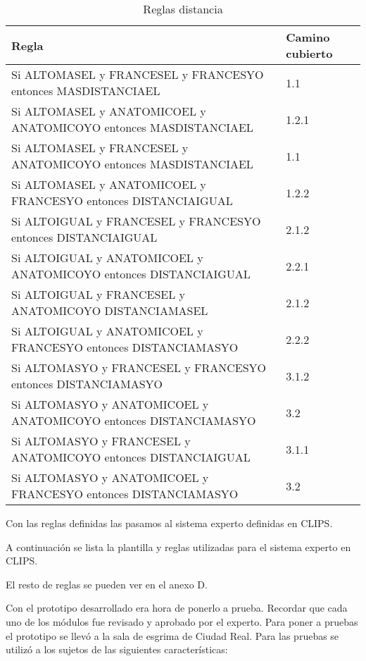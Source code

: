 \begin{table}[]
  \centering
  \caption{Reglas distancia}
  \label{tab:Reglas distancia}
  \begin{tabular}{|ll|}
    \hline
    Regla & Camino cubierto \\ \hline
    Si ALTOMASEL y FRANCESEL y FRANCESYO entonces MASDISTANCIAEL & 1.1 \\
    Si ALTOMASEL y ANATOMICOEL y ANATOMICOYO entonces MASDISTANCIAEL & 1.2.1 \\
    Si ALTOMASEL y FRANCESEL y ANATOMICOYO entonces MASDISTANCIAEL & 1.1 \\
    Si ALTOMASEL y ANATOMICOEL y FRANCESYO entonces DISTANCIAIGUAL & 1.2.2 \\
    Si ALTOIGUAL y FRANCESEL y FRANCESYO entonces DISTANCIAIGUAL & 2.1.2 \\
    Si ALTOIGUAL y ANATOMICOEL y ANATOMICOYO entonces DISTANCIAIGUAL & 2.2.1 \\
    Si ALTOIGUAL y FRANCESEL y ANATOMICOYO DISTANCIAMASEL & 2.1.2 \\
    Si ALTOIGUAL y ANATOMICOEL y FRANCESYO entonces DISTANCIAMASYO & 2.2.2 \\
    Si ALTOMASYO y FRANCESEL y FRANCESYO entonces DISTANCIAMASYO & 3.1.2 \\
    Si ALTOMASYO y ANATOMICOEL y ANATOMICOYO entonces DISTANCIAMASYO & 3.2 \\
    Si ALTOMASYO y FRANCESEL y ANATOMICOYO entonces DISTANCIAIGUAL & 3.1.1 \\
    Si ALTOMASYO y ANATOMICOEL y FRANCESYO entonces DISTANCIAMASYO & 3.2 \\ \hline
  \end{tabular}
\end{table}

Con las reglas definidas las pasamos al sistema experto definidas en CLIPS.

A continuación se lista la plantilla y reglas utilizadas para el sistema experto en CLIPS.


El resto de reglas se pueden ver en el anexo D.

Con el prototipo desarrollado era hora de ponerlo a prueba. Recordar que cada uno de los módulos
fue revisado y aprobado por el experto. Para poner a pruebas el prototipo se llevó a la sala de
esgrima de Ciudad Real. Para las pruebas se utilizó a los sujetos de las siguientes características:

